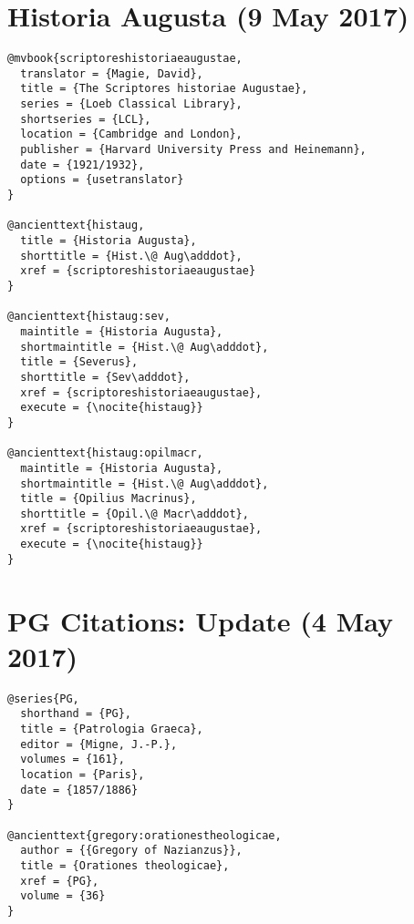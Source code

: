 \documentclass[a4paper]{article}
\begin{document}
\nocite{musoniusrufusfrag:abbrev}
\exampleancientsources
\examplesecondarysources
\examplebibliography
{}

\section{Historia Augusta (9 May 2017)}

\begin{verbatim}
@mvbook{scriptoreshistoriaeaugustae,
  translator = {Magie, David},
  title = {The Scriptores historiae Augustae},
  series = {Loeb Classical Library},
  shortseries = {LCL},
  location = {Cambridge and London},
  publisher = {Harvard University Press and Heinemann},
  date = {1921/1932},
  options = {usetranslator}
}

@ancienttext{histaug,
  title = {Historia Augusta},
  shorttitle = {Hist.\@ Aug\adddot},
  xref = {scriptoreshistoriaeaugustae}
}

@ancienttext{histaug:sev,
  maintitle = {Historia Augusta},
  shortmaintitle = {Hist.\@ Aug\adddot},
  title = {Severus},
  shorttitle = {Sev\adddot},
  xref = {scriptoreshistoriaeaugustae},
  execute = {\nocite{histaug}}
}

@ancienttext{histaug:opilmacr,
  maintitle = {Historia Augusta},
  shortmaintitle = {Hist.\@ Aug\adddot},
  title = {Opilius Macrinus},
  shorttitle = {Opil.\@ Macr\adddot},
  xref = {scriptoreshistoriaeaugustae},
  execute = {\nocite{histaug}}
}
\end{verbatim}

\nocite{histaug}
\exampleancientsources
\examplesecondarysources
\examplebibliography
{}

\section{PG Citations: Update (4 May 2017)}

\begin{verbatim}
@series{PG,
  shorthand = {PG},
  title = {Patrologia Graeca},
  editor = {Migne, J.-P.},
  volumes = {161},
  location = {Paris},
  date = {1857/1886}
}

@ancienttext{gregory:orationestheologicae,
  author = {{Gregory of Nazianzus}},
  title = {Orationes theologicae},
  xref = {PG},
  volume = {36}
}
\end{verbatim}
\end{document}
